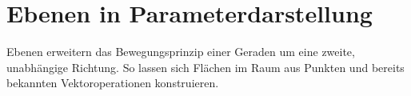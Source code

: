 \section{Ebenen in Parameterdarstellung}
\label{sec:analytic_geometry_planes}

Ebenen erweitern das Bewegungsprinzip einer Geraden um eine zweite,
unabhängige Richtung. So lassen sich Flächen im Raum aus Punkten und bereits
bekannten Vektoroperationen konstruieren.



